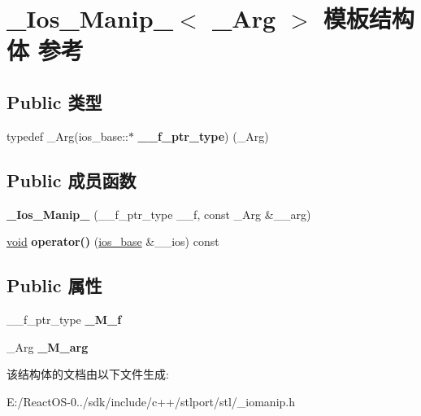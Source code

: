 \hypertarget{struct___ios___manip__1}{}\section{\+\_\+\+Ios\+\_\+\+Manip\+\_$<$ \+\_\+\+Arg $>$ 模板结构体 参考}
\label{struct___ios___manip__1}
\subsection*{Public 类型}
\begin{DoxyCompactItemize}
\item 
\mbox{\label{struct___ios___manip__1_a873eba4cbd85ab636a8eb14012563101}} 
typedef \+\_\+\+Arg(ios\+\_\+base\+::$\ast$ {\bfseries \+\_\+\+\_\+f\+\_\+ptr\+\_\+type}) (\+\_\+\+Arg)
\end{DoxyCompactItemize}
\subsection*{Public 成员函数}
\begin{DoxyCompactItemize}
\item 
\mbox{\label{struct___ios___manip__1_a290cea7752d20bd1dae5c1a1f81b9785}} 
{\bfseries \+\_\+\+Ios\+\_\+\+Manip\+\_} (\+\_\+\+\_\+f\+\_\+ptr\+\_\+type \+\_\+\+\_\+f, const \+\_\+\+Arg \&\+\_\+\+\_\+arg)
\item 
\mbox{\label{struct___ios___manip__1_aa6acf38ce87f27786c34255f0c6762a9}} 
\hyperlink{interfacevoid}{void} {\bfseries operator()} (\hyperlink{classios__base}{ios\+\_\+base} \&\+\_\+\+\_\+ios) const
\end{DoxyCompactItemize}
\subsection*{Public 属性}
\begin{DoxyCompactItemize}
\item 
\mbox{\label{struct___ios___manip__1_afb6e76933a6e8704487a4898dcf31908}} 
\+\_\+\+\_\+f\+\_\+ptr\+\_\+type {\bfseries \+\_\+\+M\+\_\+f}
\item 
\mbox{\label{struct___ios___manip__1_ae807e01bd5897cb0a3761421a2f61a82}} 
\+\_\+\+Arg {\bfseries \+\_\+\+M\+\_\+arg}
\end{DoxyCompactItemize}


该结构体的文档由以下文件生成\+:\begin{DoxyCompactItemize}
\item 
E\+:/\+React\+O\+S-\/0../sdk/include/c++/stlport/stl/\+\_\+iomanip.\+h\end{DoxyCompactItemize}
